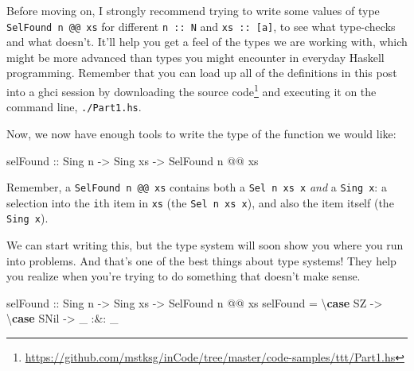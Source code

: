 \documentclass[]{article}
\newenvironment{Shaded}{}{}
\newcommand{\DataTypeTok}[1]{\textcolor[rgb]{0.56,0.13,0.00}{#1}}
\newcommand{\KeywordTok}[1]{\textcolor[rgb]{0.00,0.44,0.13}{\textbf{#1}}}
\newcommand{\NormalTok}[1]{#1}
\newcommand{\OperatorTok}[1]{\textcolor[rgb]{0.40,0.40,0.40}{#1}}
\newcommand{\OtherTok}[1]{\textcolor[rgb]{0.00,0.44,0.13}{#1}}
\renewcommand{\href}[2]{#2\footnote{\url{#1}}}
\begin{document}
Before moving on, I strongly recommend trying to write some values of type
\texttt{SelFound\ n\ @@\ xs} for different \texttt{n\ ::\ N} and
\texttt{xs\ ::\ {[}a{]}}, to see what type-checks and what doesn't. It'll help
you get a feel of the types we are working with, which might be more advanced
than types you might encounter in everyday Haskell programming. Remember that
you can load up all of the definitions in this post into a ghci session by
downloading
\href{https://github.com/mstksg/inCode/tree/master/code-samples/ttt/Part1.hs}{the
source code} and executing it on the command line, \texttt{./Part1.hs}.

Now, we now have enough tools to write the type of the function we would like:

\begin{Shaded}
\begin{Highlighting}[]
\NormalTok{selFound}
\OtherTok{    ::} \DataTypeTok{Sing}\NormalTok{ n}
    \OtherTok{{-}\textgreater{}} \DataTypeTok{Sing}\NormalTok{ xs}
    \OtherTok{{-}\textgreater{}} \DataTypeTok{SelFound}\NormalTok{ n }\OperatorTok{@@}\NormalTok{ xs}
\end{Highlighting}
\end{Shaded}

Remember, a \texttt{SelFound\ n\ @@\ xs} contains both a \texttt{Sel\ n\ xs\ x}
\emph{and} a \texttt{Sing\ x}: a selection into the \texttt{i}th item in
\texttt{xs} (the \texttt{Sel\ n\ xs\ x}), and also the item itself (the
\texttt{Sing\ x}).

We can start writing this, but the type system will soon show you where you run
into problems. And that's one of the best things about type systems! They help
you realize when you're trying to do something that doesn't make sense.

\begin{Shaded}
\begin{Highlighting}[]
\NormalTok{selFound}
\OtherTok{    ::} \DataTypeTok{Sing}\NormalTok{ n}
    \OtherTok{{-}\textgreater{}} \DataTypeTok{Sing}\NormalTok{ xs}
    \OtherTok{{-}\textgreater{}} \DataTypeTok{SelFound}\NormalTok{ n }\OperatorTok{@@}\NormalTok{ xs}
\NormalTok{selFound }\OtherTok{=}\NormalTok{ \textbackslash{}}\KeywordTok{case}
    \DataTypeTok{SZ} \OtherTok{{-}\textgreater{}}\NormalTok{ \textbackslash{}}\KeywordTok{case}
      \DataTypeTok{SNil} \OtherTok{{-}\textgreater{}}\NormalTok{ \_ }\OperatorTok{:\&:}\NormalTok{ \_}
\end{Highlighting}
\end{Shaded}
\end{document}
